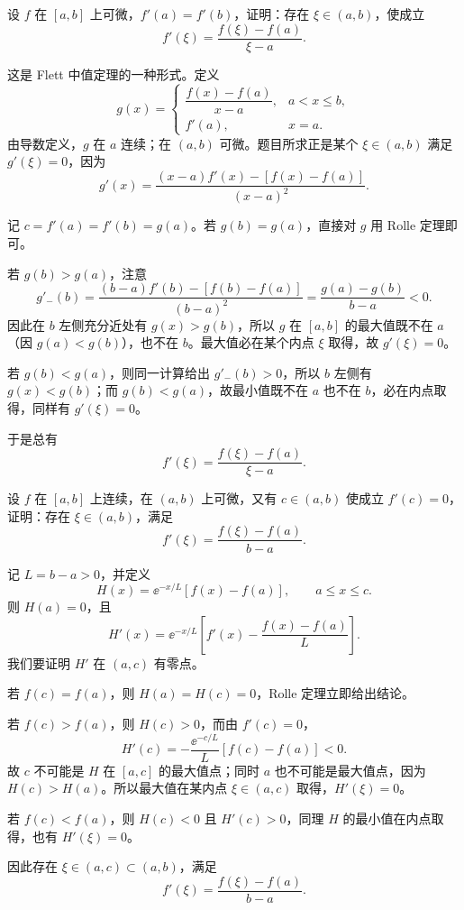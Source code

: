 \begin{xreferenceproblem}[5]
设 $f$ 在 $[a,b]$ 上可微，$f'(a)=f'(b)$，证明：存在 $\xi\in(a,b)$，使成立
\[
  f'(\xi)=\frac{f(\xi)-f(a)}{\xi-a}.
\]
\end{xreferenceproblem}
\begin{xsolution}
这是 Flett 中值定理的一种形式。定义
\[
  g(x)=
  \begin{cases}
    \dfrac{f(x)-f(a)}{x-a},&a<x\leqslant b,\\[1ex]
    f'(a),&x=a.
  \end{cases}
\]
由导数定义，$g$ 在 $a$ 连续；在 $(a,b)$ 可微。题目所求正是某个 $\xi\in(a,b)$ 满足 $g'(\xi)=0$，因为
\[
  g'(x)=\frac{(x-a)f'(x)-[f(x)-f(a)]}{(x-a)^2}.
\]

记 $c=f'(a)=f'(b)=g(a)$。若 $g(b)=g(a)$，直接对 $g$ 用 Rolle 定理即可。

若 $g(b)>g(a)$，注意
\[
  g'_-(b)
  =\frac{(b-a)f'(b)-[f(b)-f(a)]}{(b-a)^2}
  =\frac{g(a)-g(b)}{b-a}<0.
\]
因此在 $b$ 左侧充分近处有 $g(x)>g(b)$，所以 $g$ 在 $[a,b]$ 的最大值既不在 $a$（因 $g(a)<g(b)$），也不在 $b$。最大值必在某个内点 $\xi$ 取得，故 $g'(\xi)=0$。

若 $g(b)<g(a)$，则同一计算给出 $g'_-(b)>0$，所以 $b$ 左侧有 $g(x)<g(b)$；而 $g(b)<g(a)$，故最小值既不在 $a$ 也不在 $b$，必在内点取得，同样有 $g'(\xi)=0$。

于是总有
\[
  f'(\xi)=\frac{f(\xi)-f(a)}{\xi-a}.
\]
\end{xsolution}


\begin{xreferenceproblem}[6]
设 $f$ 在 $[a,b]$ 上连续，在 $(a,b)$ 上可微，又有 $c\in(a,b)$ 使成立 $f'(c)=0$，证明：存在 $\xi\in(a,b)$，满足
\[
  f'(\xi)=\frac{f(\xi)-f(a)}{b-a}.
\]
\end{xreferenceproblem}
\begin{xsolution}
记 $L=b-a>0$，并定义
\[
  H(x)=\ee^{-x/L}[f(x)-f(a)],\qquad a\leqslant x\leqslant c.
\]
则 $H(a)=0$，且
\[
  H'(x)=\ee^{-x/L}
  \left[f'(x)-\frac{f(x)-f(a)}L\right].
\]
我们要证明 $H'$ 在 $(a,c)$ 有零点。

若 $f(c)=f(a)$，则 $H(a)=H(c)=0$，Rolle 定理立即给出结论。

若 $f(c)>f(a)$，则 $H(c)>0$，而由 $f'(c)=0$，
\[
  H'(c)=-\frac{\ee^{-c/L}}L[f(c)-f(a)]<0.
\]
故 $c$ 不可能是 $H$ 在 $[a,c]$ 的最大值点；同时 $a$ 也不可能是最大值点，因为 $H(c)>H(a)$。所以最大值在某内点 $\xi\in(a,c)$ 取得，$H'(\xi)=0$。

若 $f(c)<f(a)$，则 $H(c)<0$ 且 $H'(c)>0$，同理 $H$ 的最小值在内点取得，也有 $H'(\xi)=0$。

因此存在 $\xi\in(a,c)\subset(a,b)$，满足
\[
  f'(\xi)=\frac{f(\xi)-f(a)}{b-a}.
\]
\end{xsolution}


